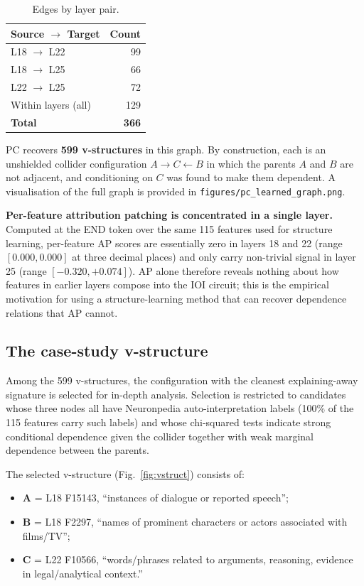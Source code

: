 \documentclass[conference]{IEEEtran}
\begin{document}
\begin{table}[t]
\caption{Edges by layer pair.}
\label{tab:edges}
\centering
\begin{tabular}{lr}
\toprule
Source $\to$ Target & Count \\
\midrule
L18 $\to$ L22       & 99 \\
L18 $\to$ L25       & 66 \\
L22 $\to$ L25       & 72 \\
Within layers (all) & 129 \\
\midrule
\textbf{Total}      & \textbf{366} \\
\bottomrule
\end{tabular}
\end{table}

PC recovers \textbf{599 v-structures} in this graph. By construction, each is an unshielded collider configuration $A \to C \leftarrow B$ in which the parents $A$ and $B$ are not adjacent, and conditioning on $C$ was found to make them dependent. A visualisation of the full graph is provided in \texttt{figures/pc\_learned\_graph.png}.

\textbf{Per-feature attribution patching is concentrated in a single layer.} Computed at the END token over the same 115 features used for structure learning, per-feature AP scores are essentially zero in layers 18 and 22 (range $[0.000, 0.000]$ at three decimal places) and only carry non-trivial signal in layer 25 (range $[-0.320, +0.074]$). AP alone therefore reveals nothing about how features in earlier layers compose into the IOI circuit; this is the empirical motivation for using a structure-learning method that can recover dependence relations that AP cannot.

\subsection{The case-study v-structure}
Among the 599 v-structures, the configuration with the cleanest explaining-away signature is selected for in-depth analysis. Selection is restricted to candidates whose three nodes all have Neuronpedia auto-interpretation labels (100\% of the 115 features carry such labels) and whose chi-squared tests indicate strong conditional dependence given the collider together with weak marginal dependence between the parents.

The selected v-structure (Fig.~\ref{fig:vstruct}) consists of:
\begin{itemize}
\item \textbf{A} = L18 F15143, ``instances of dialogue or reported speech'';
\item \textbf{B} = L18 F2297, ``names of prominent characters or actors associated with films/TV'';
\item \textbf{C} = L22 F10566, ``words/phrases related to arguments, reasoning, evidence in legal/analytical context.''
\end{itemize}
\end{document}
